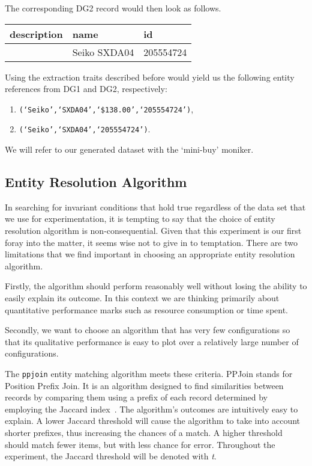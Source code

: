The corresponding DG2 record would then look as follows.

\begin{table}[ht]
    \setlength\tabcolsep{5pt}
    \begin{tabular}[b]{|l|l|l|}
        \hline
        description&name&id \\
        \hline
        &Seiko SXDA04&205554724 \\
        \hline
    \end{tabular}\label{tab:dg2-record}
\end{table}

Using the extraction traits described before would yield us the
following entity references from DG1 and DG2, respectively:
\begin{enumerate}
    \item \texttt{(`Seiko',`SXDA04',`\$138.00',`205554724')},
    \item \texttt{(`Seiko',`SXDA04',`205554724')}.
\end{enumerate}

We will refer to our generated dataset with the `mini-buy' moniker.

\subsection{Entity Resolution Algorithm}\label{subsec:entity-resolution-algorithm}

In searching for invariant conditions that hold true regardless of the data set
that we use for experimentation, it is tempting to say that the choice of entity
resolution algorithm is non-consequential.
Given that this experiment is our first foray into the matter, it seems wise not
to give in to temptation.
There are two limitations that we find important in choosing an appropriate
entity resolution algorithm.

Firstly, the algorithm should perform reasonably well without losing the ability
to easily explain its outcome.
In this context we are thinking primarily about quantitative performance marks
such as resource consumption or time spent.

Secondly, we want to choose an algorithm that has very few configurations so
that its qualitative performance is easy to plot over a relatively large  number
of configurations.

The \texttt{ppjoin}\cite{ppjoin} entity matching algorithm meets these criteria.
PPJoin stands for Position Prefix Join.
It is an algorithm designed to find similarities between records by comparing
them using a prefix of each record determined by employing the Jaccard
index~\cite{jaccard1912,finley1996}.
The algorithm's outcomes are intuitively easy to explain.
A lower Jaccard threshold will cause the algorithm to take into account shorter
prefixes, thus increasing the chances of a match.
A higher threshold should match fewer items, but with less chance for error.
Throughout the experiment, the Jaccard threshold will be denoted with \textit{t}.

